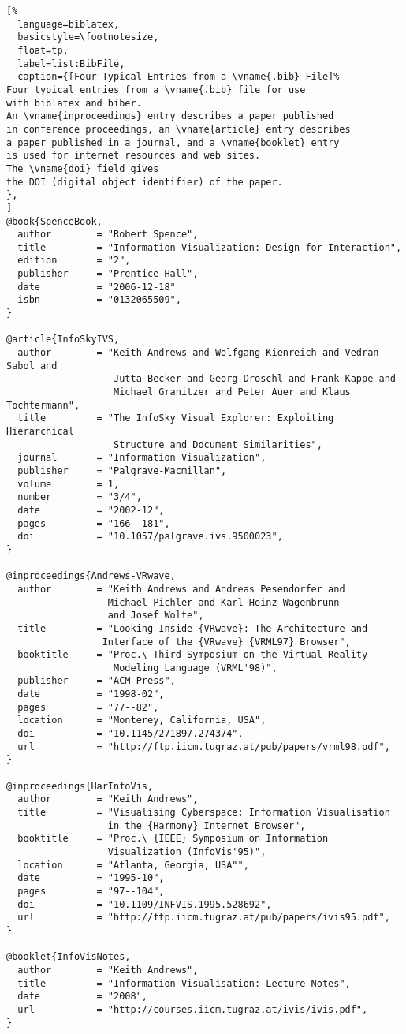 \begin{lstlisting}[%
  language=biblatex,
  basicstyle=\footnotesize,
  float=tp,
  label=list:BibFile,
  caption={[Four Typical Entries from a \vname{.bib} File]%
Four typical entries from a \vname{.bib} file for use
with biblatex and biber.
An \vname{inproceedings} entry describes a paper published
in conference proceedings, an \vname{article} entry describes
a paper published in a journal, and a \vname{booklet} entry
is used for internet resources and web sites.
The \vname{doi} field gives
the DOI (digital object identifier) of the paper.
},
]
@book{SpenceBook,
  author        = "Robert Spence",
  title         = "Information Visualization: Design for Interaction",
  edition       = "2",
  publisher     = "Prentice Hall",
  date          = "2006-12-18"
  isbn          = "0132065509",
}

@article{InfoSkyIVS,
  author        = "Keith Andrews and Wolfgang Kienreich and Vedran Sabol and
                   Jutta Becker and Georg Droschl and Frank Kappe and
                   Michael Granitzer and Peter Auer and Klaus Tochtermann",
  title         = "The InfoSky Visual Explorer: Exploiting Hierarchical
                   Structure and Document Similarities",
  journal       = "Information Visualization",
  publisher     = "Palgrave-Macmillan",
  volume        = 1,
  number        = "3/4",
  date          = "2002-12",
  pages         = "166--181",
  doi           = "10.1057/palgrave.ivs.9500023",
}

@inproceedings{Andrews-VRwave,
  author        = "Keith Andrews and Andreas Pesendorfer and
                  Michael Pichler and Karl Heinz Wagenbrunn
                  and Josef Wolte",
  title         = "Looking Inside {VRwave}: The Architecture and
                 Interface of the {VRwave} {VRML97} Browser",
  booktitle     = "Proc.\ Third Symposium on the Virtual Reality
                   Modeling Language (VRML'98)",
  publisher     = "ACM Press",
  date          = "1998-02",
  pages         = "77--82",
  location      = "Monterey, California, USA",
  doi           = "10.1145/271897.274374",
  url           = "http://ftp.iicm.tugraz.at/pub/papers/vrml98.pdf",
}

@inproceedings{HarInfoVis,
  author        = "Keith Andrews",
  title         = "Visualising Cyberspace: Information Visualisation
                  in the {Harmony} Internet Browser",
  booktitle     = "Proc.\ {IEEE} Symposium on Information
                  Visualization (InfoVis'95)",
  location      = "Atlanta, Georgia, USA"",
  date          = "1995-10",
  pages         = "97--104",
  doi           = "10.1109/INFVIS.1995.528692",
  url           = "http://ftp.iicm.tugraz.at/pub/papers/ivis95.pdf",
}

@booklet{InfoVisNotes,
  author        = "Keith Andrews",
  title         = "Information Visualisation: Lecture Notes",
  date          = "2008",
  url           = "http://courses.iicm.tugraz.at/ivis/ivis.pdf",
}
\end{lstlisting}


